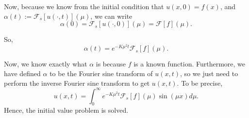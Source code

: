 Now, because we know from the initial condition that $u(x,0) = f(x)$, and $\alpha(t) := \mathcal{F}_s\left[u(\cdot,t)\right](\mu)$, we can write
$$\alpha(0) = \mathcal{F}_s\left[u(\cdot,0)\right](\mu)=\mathcal{F}\left[f\right](\mu).$$

So, $$\alpha(t) = e^{-K\mu^2t}\mathcal{F}_s\left[f\right](\mu).$$

Now, we know exactly what $\alpha$ is because $f$ is a known function. Furthermore, we have defined $\alpha$ to be the Fourier sine transform of $u(x,t)$, so we just need to perform the inverse Fourier sine transform to get $u(x,t)$. To be precise,
$$u(x,t) = \int_{0}^{\infty}e^{-K\mu^2t}\mathcal{F}_s\left[f\right](\mu) \sin(\mu x) d\mu.$$
Hence, the initial value problem is solved.
